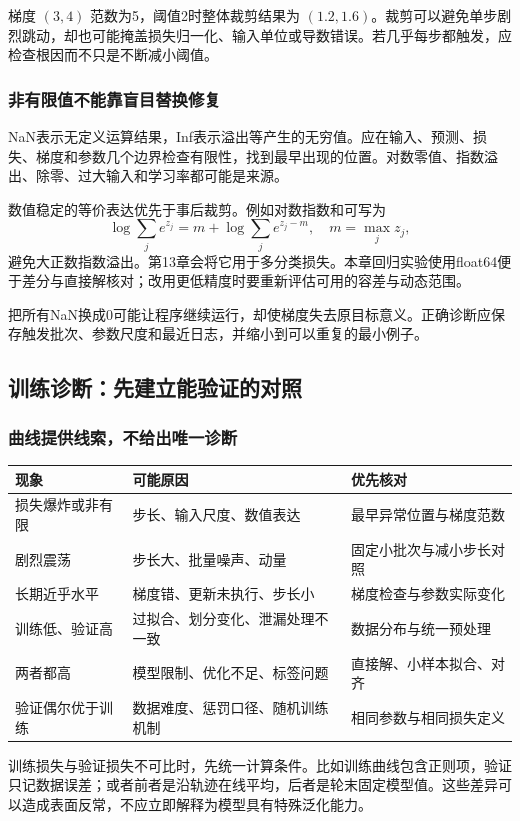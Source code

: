 \documentclass[UTF8,fontset=none,zihao=-4,a4paper]{ctexart}
\numberwithin{equation}{section}
\numberwithin{figure}{section}
\begin{document}
梯度 $(3,4)$ 范数为5，阈值2时整体裁剪结果为 $(1.2,1.6)$。裁剪可以避免单步剧烈跳动，却也可能掩盖损失归一化、输入单位或导数错误。若几乎每步都触发，应检查根因而不只是不断减小阈值。

\subsubsection{非有限值不能靠盲目替换修复}
NaN表示无定义运算结果，Inf表示溢出等产生的无穷值。应在输入、预测、损失、梯度和参数几个边界检查有限性，找到最早出现的位置。对数零值、指数溢出、除零、过大输入和学习率都可能是来源。

数值稳定的等价表达优先于事后裁剪。例如对数指数和可写为
\[
 \log\sum_j e^{z_j}=m+\log\sum_j e^{z_j-m},\quad m=\max_jz_j,
\]
避免大正数指数溢出。第13章会将它用于多分类损失。本章回归实验使用float64便于差分与直接解核对；改用更低精度时要重新评估可用的容差与动态范围。

把所有NaN换成0可能让程序继续运行，却使梯度失去原目标意义。正确诊断应保存触发批次、参数尺度和最近日志，并缩小到可以重复的最小例子。

\subsection{训练诊断：先建立能验证的对照}
\subsubsection{曲线提供线索，不给出唯一诊断}
\begin{center}
\begin{tabularx}{\linewidth}{l Y Y}
\toprule
现象 & 可能原因 & 优先核对\\\midrule
损失爆炸或非有限 & 步长、输入尺度、数值表达 & 最早异常位置与梯度范数\\
剧烈震荡 & 步长大、批量噪声、动量 & 固定小批次与减小步长对照\\
长期近乎水平 & 梯度错、更新未执行、步长小 & 梯度检查与参数实际变化\\
训练低、验证高 & 过拟合、划分变化、泄漏处理不一致 & 数据分布与统一预处理\\
两者都高 & 模型限制、优化不足、标签问题 & 直接解、小样本拟合、对齐\\
验证偶尔优于训练 & 数据难度、惩罚口径、随机训练机制 & 相同参数与相同损失定义\\\bottomrule
\end{tabularx}
\end{center}
训练损失与验证损失不可比时，先统一计算条件。比如训练曲线包含正则项，验证只记数据误差；或者前者是沿轨迹在线平均，后者是轮末固定模型值。这些差异可以造成表面反常，不应立即解释为模型具有特殊泛化能力。
\end{document}
